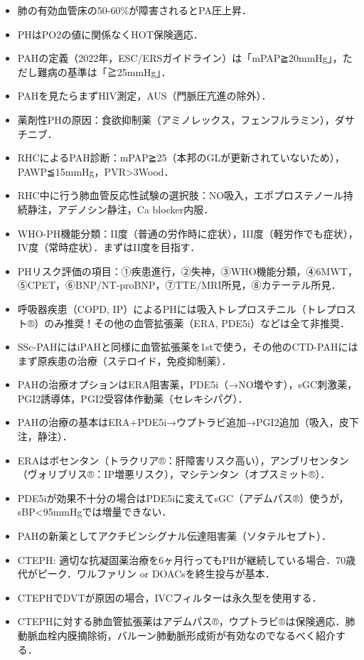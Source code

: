 \begin{itemize}
\item 肺の有効血管床の50-60\%が障害されるとPA圧上昇．
\item PHはPO2の値に関係なくHOT保険適応．
\item PAHの定義（2022年，ESC/ERSガイドライン）は「mPAP≧20mmHg」，ただし難病の基準は「≧25mmHg」．
\item PAHを見たらまずHIV測定，AUS（門脈圧亢進の除外）．
\item 薬剤性PHの原因：食欲抑制薬（アミノレックス，フェンフルラミン），ダサチニブ．
\item RHCによるPAH診断：mPAP≧25（本邦のGLが更新されていないため），PAWP≦15mmHg，PVR>3Wood．
\item RHC中に行う肺血管反応性試験の選択肢：NO吸入，エポプロステノール持続静注，アデノシン静注，Ca blocker内服．
\item WHO-PH機能分類：II度（普通の労作時に症状），III度（軽労作でも症状），IV度（常時症状）．まずはII度を目指す．
\item PHリスク評価の項目：①疾患進行，②失神，③WHO機能分類，④6MWT，⑤CPET，⑥BNP/NT-proBNP，⑦TTE/MRI所見，⑧カテーテル所見．


\item 呼吸器疾患（COPD, IP）によるPHには吸入トレプロスチニル（トレプロスト®）のみ推奨！その他の血管拡張薬（ERA, PDE5i）などは全て非推奨．
\item SSc-PAHにはiPAHと同様に血管拡張薬を1stで使う，その他のCTD-PAHにはまず原疾患の治療（ステロイド，免疫抑制薬）．
\item PAHの治療オプションはERA阻害薬，PDE5i（→NO増やす），sGC刺激薬，PGI2誘導体，PGI2受容体作動薬（セレキシパグ）．
\item PAHの治療の基本はERA+PDE5i→ウプトラビ追加→PGI2追加（吸入，皮下注，静注）．
\item ERAはボセンタン（トラクリア®：肝障害リスク高い），アンブリセンタン（ヴォリブリス®：IP増悪リスク），マシテンタン（オプスミット®）．
\item PDE5iが効果不十分の場合はPDE5iに変えてsGC（アデムパス®）使うが，sBP<95mmHgでは増量できない．
\item PAHの新薬としてアクチビンシグナル伝達阻害薬（ソタテルセプト）．
\item CTEPH: 適切な抗凝固薬治療を6ヶ月行ってもPHが継続している場合．70歳代がピーク．ワルファリン or DOACsを終生投与が基本．
\item CTEPHでDVTが原因の場合，IVCフィルターは永久型を使用する．
\item CTEPHに対する肺血管拡張薬はアデムパス®，ウプトラビ®は保険適応．肺動脈血栓内膜摘除術，バルーン肺動脈形成術が有効なのでなるべく紹介する．
\end{itemize}


